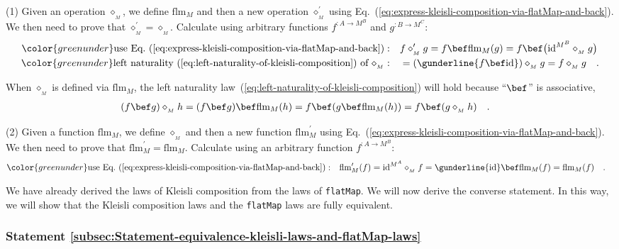 (1) Given an operation $\diamond_{_{M}}$, we define $\text{flm}_{M}$
and then a new operation $\diamond_{_{M}}^{\prime}$ using Eq.~(\ref{eq:express-kleisli-composition-via-flatMap-and-back}).
We then need to prove that $\diamond_{_{M}}^{\prime}=\diamond_{_{M}}$.
Calculate using arbitrary functions $f^{:A\rightarrow M^{B}}$ and
$g^{:B\rightarrow M^{C}}$:
\begin{align*}
{\color{greenunder}\text{use Eq.~(\ref{eq:express-kleisli-composition-via-flatMap-and-back})}:}\quad & f\diamond_{_{M}}^{\prime}g=f\bef\text{flm}_{M}(g)=f\bef\big(\text{id}^{M^{B}}\diamond_{_{M}}g\big)\\
{\color{greenunder}\text{left naturality~(\ref{eq:left-naturality-of-kleisli-composition}) of }\diamond_{_{M}}:}\quad & =(\gunderline{f\bef\text{id}})\diamond_{_{M}}g=f\diamond_{_{M}}g\quad.
\end{align*}

When $\diamond_{_{M}}$ is defined via $\text{flm}_{M}$, the left
naturality law~(\ref{eq:left-naturality-of-kleisli-composition})
will hold because \textsf{``}$\bef$\textsf{''} is associative,
\begin{align*}
 & (f\bef g)\diamond_{_{M}}h=(f\bef g)\bef\text{flm}_{M}(h)=f\bef(g\bef\text{flm}_{M}(h))=f\bef(g\diamond_{_{M}}h)\quad.
\end{align*}

(2) Given a function $\text{flm}_{M}$, we define $\diamond_{_{M}}$
and then a new function $\text{flm}_{M}^{\prime}$ using Eq.~(\ref{eq:express-kleisli-composition-via-flatMap-and-back}).
We then need to prove that $\text{flm}_{M}^{\prime}=\text{flm}_{M}$.
Calculate using an arbitrary function $f^{:A\rightarrow M^{B}}$:
\begin{align*}
{\color{greenunder}\text{use Eq.~(\ref{eq:express-kleisli-composition-via-flatMap-and-back})}:}\quad & \text{flm}_{M}^{\prime}(f)=\text{id}^{M^{A}}\diamond_{_{M}}f=\gunderline{\text{id}}\bef\text{flm}_{M}(f)=\text{flm}_{M}(f)\quad.
\end{align*}

We have already derived the laws of Kleisli composition from the laws
of \lstinline!flatMap!. We will now derive the converse statement.
In this way, we will show that the Kleisli composition laws and the
\lstinline!flatMap! laws are fully equivalent.

\subsubsection{Statement \label{subsec:Statement-equivalence-kleisli-laws-and-flatMap-laws}\ref{subsec:Statement-equivalence-kleisli-laws-and-flatMap-laws}}

